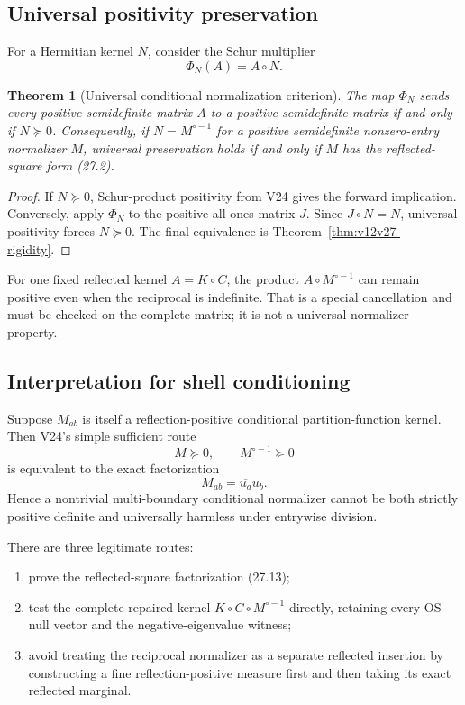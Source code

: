 \documentclass[11pt]{article}
\newtheorem{theorem}{Theorem}[section]
\theoremstyle{remark}
\begin{document}
\subsection{Universal positivity preservation}

For a Hermitian kernel \(N\), consider the Schur multiplier
\[
                         \Phi_N(A)=A\circ N.                 \tag{27.11}
\]

\begin{theorem}[Universal conditional normalization criterion]
\label{thm:v12v27-universal}
The map \(\Phi_N\) sends every positive semidefinite matrix \(A\) to
a positive semidefinite matrix if and only if \(N\succeq0\).
Consequently, if \(N=M^{\circ-1}\) for a positive semidefinite
nonzero-entry normalizer \(M\), universal preservation holds if and
only if \(M\) has the reflected-square form (27.2).
\end{theorem}

\begin{proof}
If \(N\succeq0\), Schur-product positivity from V24 gives the forward
implication.  Conversely, apply \(\Phi_N\) to the positive
all-ones matrix \(J\).  Since \(J\circ N=N\), universal positivity
forces \(N\succeq0\).  The final equivalence is
Theorem~\ref{thm:v12v27-rigidity}.
\end{proof}

For one fixed reflected kernel \(A=K\circ C\), the product
\(A\circ M^{\circ-1}\) can remain positive even when the reciprocal
is indefinite.  That is a special cancellation and must be checked
on the complete matrix; it is not a universal normalizer property.

\subsection{Interpretation for shell conditioning}

Suppose \(M_{ab}\) is itself a reflection-positive conditional
partition-function kernel.  Then V24's simple sufficient route
\[
                         M\succeq0,\qquad
                         M^{\circ-1}\succeq0                \tag{27.12}
\]
is equivalent to the exact factorization
\[
                         M_{ab}=\overline{u_a}u_b.           \tag{27.13}
\]
Hence a nontrivial multi-boundary conditional normalizer cannot be
both strictly positive definite and universally harmless under
entrywise division.

There are three legitimate routes:

\begin{enumerate}
\item prove the reflected-square factorization (27.13);
\item test the complete repaired kernel
      \(K\circ C\circ M^{\circ-1}\) directly, retaining every OS
      null vector and the negative-eigenvalue witness;
\item avoid treating the reciprocal normalizer as a separate
      reflected insertion by constructing a fine
      reflection-positive measure first and then taking its exact
      reflected marginal.
\end{enumerate}
\end{document}
